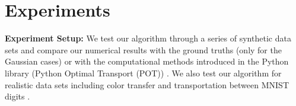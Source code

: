 \documentclass{article}
\begin{document}


\section{Experiments}
\textbf{Experiment Setup:}
We test our algorithm through a series of synthetic data sets and compare our numerical results with the ground truths (only for the Gaussian cases) or with the computational methods introduced in the Python library (Python Optimal Transport (POT)) \citep{JMLR:v22:20-451}. We also test our algorithm for realistic data sets including color transfer \citep{10.1109/38.946629} and transportation between MNIST digits \citep{726791}. 
\end{document}
